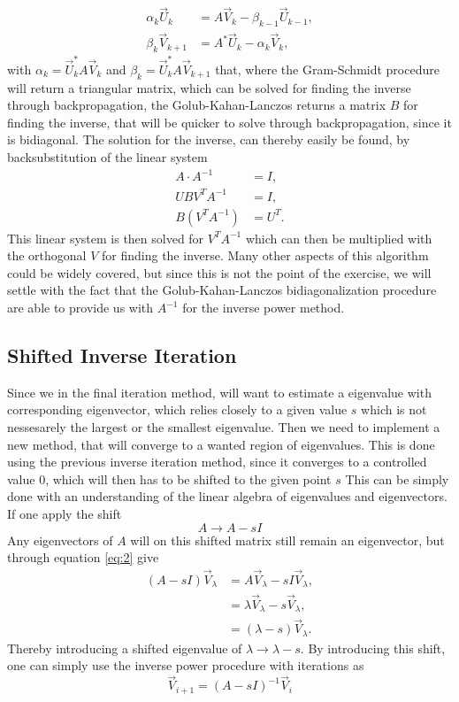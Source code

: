 \documentclass[twocolumn]{article}
\begin{document}
\begin{align}
\alpha_k \vec{U}_{k} &= A\vec{V}_k - \beta_{k-1} \vec{U}_{k-1}, \\
\beta_k \vec{V}_{k+1} &= A^{\ast}\vec{U}_k - \alpha_k \vec{V}_k,
\end{align}
with $\alpha_k = \vec{U}_k^\ast A \vec{V}_k$ and $\beta_k = \vec{U}_k^\ast A \vec{V}_{k+1}$ that, where the Gram-Schmidt procedure will return a triangular matrix, which can be solved for finding the inverse through backpropagation, the Golub-Kahan-Lanczos returns a matrix $B$ for finding the inverse, that will be quicker to solve through backpropagation, since it is bidiagonal. The solution for the inverse, can thereby easily be found, by backsubstitution of the linear system
\begin{align}
A \cdot A^{-1} &= I,\\
U B V^T A^{-1} &= I,\\
B \left(V^T  A^{-1}\right) &= U^T.
\end{align}
This linear system is then solved for $V^T  A^{-1}$ which can then be multiplied with the orthogonal $V$ for finding the inverse. Many other aspects of this algorithm could be widely covered, but since this is not the point of the exercise, we will settle with the fact that the Golub-Kahan-Lanczos bidiagonalization procedure are able to provide us with $A^{-1}$ for the inverse power method.

\subsection{\label{sec:3} Shifted Inverse Iteration} 
Since we in the final iteration method, will want to estimate a eigenvalue with corresponding eigenvector, which relies closely to a given value $s$ which is not nessesarely the largest or the smallest eigenvalue. Then we need to implement a new method, that will converge to a wanted region of eigenvalues. This is done using the previous inverse iteration method, since it converges to a controlled value $0$, which will then has to be shifted to the given point $s$
 This can be simply done with an understanding of the linear algebra of eigenvalues and eigenvectors. If one apply the shift
\begin{equation}
A \rightarrow A - sI
\end{equation} 
Any eigenvectors of $A$ will on this shifted matrix still remain an eigenvector, but through equation \eqref{eq:2} give
\begin{align}
\left(A - s I\right) \vec{V}_\lambda &=  A \vec{V}_\lambda - s I \vec{V}_\lambda, \\
 &= \lambda \vec{V}_\lambda  -  s \vec{V}_\lambda, \\ 
 &= \left(\lambda - s\right) \vec{V}_\lambda. 
\end{align}
Thereby introducing a shifted eigenvalue of $\lambda \rightarrow \lambda - s$. By introducing this shift, one can simply use the inverse power procedure with iterations as
\begin{equation}
\vec{V}_{i+1} = \left(A - sI\right)^{-1} \vec{V}_i \label{eq:6}
\end{equation}
\end{document}
